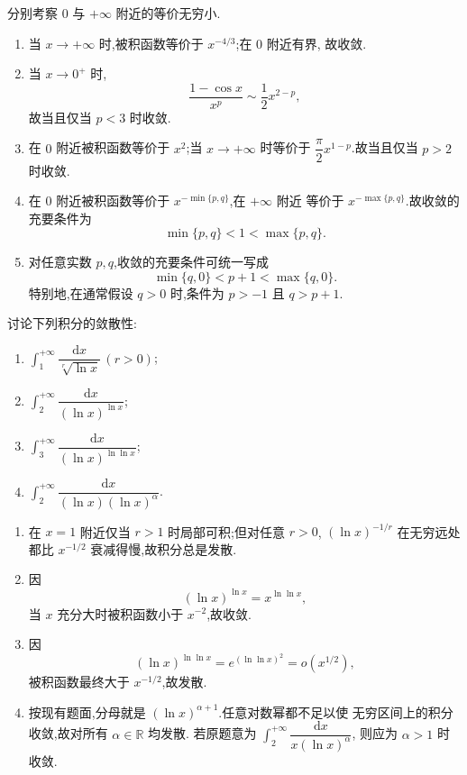 \begin{solution}
  分别考察 $0$ 与 $+\infty$ 附近的等价无穷小.
  \begin{enumerate}
    \item 当 $x\to+\infty$ 时,被积函数等价于 $x^{-4/3}$;在 $0$ 附近有界,
          故收敛.
    \item 当 $x\to0^+$ 时,
          \[
            \dfrac{1-\cos x}{x^p}\sim\dfrac{1}{2}x^{2-p},
          \]
          故当且仅当 $p<3$ 时收敛.
    \item 在 $0$ 附近被积函数等价于 $x^2$;当 $x\to+\infty$ 时等价于
          $\dfrac{\pi}{2}x^{1-p}$.故当且仅当 $p>2$ 时收敛.
    \item 在 $0$ 附近被积函数等价于 $x^{-\min\{p,q\}}$,在 $+\infty$ 附近
          等价于 $x^{-\max\{p,q\}}$.故收敛的充要条件为
          \[
            \min\{p,q\}<1<\max\{p,q\}.
          \]
    \item 对任意实数 $p,q$,收敛的充要条件可统一写成
          \[
            \min\{q,0\}<p+1<\max\{q,0\}.
          \]
          特别地,在通常假设 $q>0$ 时,条件为 $p>-1$ 且 $q>p+1$.
  \end{enumerate}
\end{solution}

\begin{example}
  讨论下列积分的敛散性:
  \begin{enumerate}
    \item $\displaystyle\int_1^{+\infty}\dfrac{\mathrm{d}x}{\sqrt[r]{\ln x}}\,(r>0)$;
    \item $\displaystyle\int_2^{+\infty}\dfrac{\mathrm{d}x}{(\ln x)^{\ln x}}$;
    \item $\displaystyle\int_3^{+\infty}\dfrac{\mathrm{d}x}{(\ln x)^{\ln\ln x}}$;
    \item $\displaystyle\int_2^{+\infty}\dfrac{\mathrm{d}x}{(\ln x)(\ln x)^\alpha}$.
  \end{enumerate}
\end{example}
\exampleblank

\begin{solution}
  \leavevmode
  \begin{enumerate}
    \item 在 $x=1$ 附近仅当 $r>1$ 时局部可积;但对任意 $r>0$,
          $(\ln x)^{-1/r}$ 在无穷远处都比 $x^{-1/2}$ 衰减得慢,故积分总是发散.
    \item 因
          \[
            (\ln x)^{\ln x}=x^{\ln\ln x},
          \]
          当 $x$ 充分大时被积函数小于 $x^{-2}$,故收敛.
    \item 因
          \[
            (\ln x)^{\ln\ln x}=e^{(\ln\ln x)^2}=o(x^{1/2}),
          \]
          被积函数最终大于 $x^{-1/2}$,故发散.
    \item 按现有题面,分母就是 $(\ln x)^{\alpha+1}$.任意对数幂都不足以使
          无穷区间上的积分收敛,故对所有 $\alpha\in\mathbb{R}$ 均发散.
          若原题意为 $\displaystyle\int_2^{+\infty}\dfrac{\mathrm{d}x}{x(\ln x)^\alpha}$,
          则应为 $\alpha>1$ 时收敛.
  \end{enumerate}
\end{solution}

